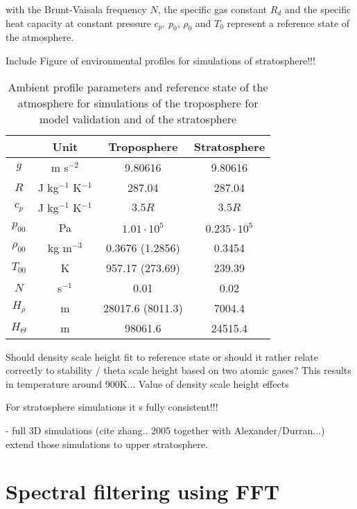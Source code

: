 with the Brunt-Vaisala frequency $N$, the specific gas constant $R_d$ and the specific heat capacity at constant pressure $c_p$. $p_0$, $\rho_0$ and $T_0$ represent a reference state of the atmosphere.

\begin{table*}[ht]
\centering
\caption{Ambient profile parameters and reference state of the atmosphere for simulations of the troposphere for model validation and of the stratosphere}


Include Figure of environmental profiles for simulations of stratosphere!!!


\begin{tabular}{@{}cccc@{}}
\toprule
 & Unit & Troposphere & Stratosphere \\ \midrule[1pt]

$g$ & m s$^{-2}$ & 9.80616 & 9.80616 \\
$R$ & J kg$^{-1}$ K$^{-1}$ & 287.04 & 287.04 \\
$c_p$ & J kg$^{-1}$ K$^{-1}$ & $3.5 R$ & $3.5 R$ \\
$p_{00}$ & Pa & $1.01 \cdot 10^5$ & $0.235 \cdot 10^5$ \\
$\rho_{00}$ & kg m$^{-3}$ & 0.3676 (1.2856) & 0.3454 \\
$T_{00}$ & K & 957.17 (273.69) & 239.39 \\
$N$ & s$^{-1}$ & 0.01 & 0.02 \\
$H_{\rho}$ & m & 28017.6 (8011.3)  & 7004.4 \\
$H_{\Theta}$ & m & 98061.6 & 24515.4  \\

\bottomrule
\end{tabular}
\label{tab:ambientProfiles}
\end{table*}

Should density scale height fit to reference state or should it rather relate correctly to stability / theta scale height based on two atomic gases? This results in temperature around 900K...
Value of density scale height effects

For stratosphere simulations it s fully consistent!!! 

- full 3D simulations (cite zhang.. 2005 together with Alexander/Durran...) extend those simulations to upper stratosphere.


\section{Spectral filtering using FFT}

